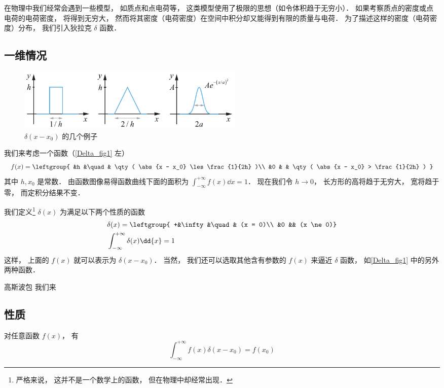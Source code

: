 
在物理中我们经常会遇到一些模型， 如质点和点电荷等， 这类模型使用了极限的思想（如令体积趋于无穷小）． 如果考察质点的密度或点电荷的电荷密度， 将得到无穷大， 然而将其密度（电荷密度）在空间中积分却又能得到有限的质量与电荷． 为了描述这样的密度（电荷密度）分布， 我们引入狄拉克 $\delta$ 函数．

\subsection{一维情况}

\begin{figure}[ht]
\centering
\includegraphics[width=11cm]{./figures/Delta1.pdf}
\caption{$\delta(x - x_0)$ 的几个例子} \label{Delta_fig1}
\end{figure}

我们来考虑一个函数（\autoref{Delta_fig1} 左）
\begin{equation}
f(x) = \leftgroup{
&h &\quad & \qty( \abs{x - x_0} \les \frac{1}{2h} )\\
&0 &          & \qty( \abs{x - x_0} > \frac{1}{2h} )
}\end{equation}
其中 $h, x_0$ 是常数． 由函数图像易得函数曲线下面的面积为 $\int_{-\infty}^{+\infty} f(x) \dd{x} = 1$． 现在我们令 $h \to 0$， 长方形的高将趋于无穷大， 宽将趋于零， 而定积分结果不变．

我们定义\footnote{严格来说， 这并不是一个数学上的函数， 但在物理中却经常出现．} $\delta(x)$ 为满足以下两个性质的函数
\begin{align}
&\delta(x) = \leftgroup{
+&\infty &\quad& (x = 0)\\
&0 && (x \ne 0)}\\
&\int_{-\infty}^{+\infty} \delta(x) \dd{x} = 1
\end{align}
这样， 上面的 $f(x)$ 就可以表示为 $\delta(x - x_0)$． 当然， 我们还可以选取其他含有参数的 $f(x)$ 来逼近 $\delta$ 函数， 如\autoref{Delta_fig1} 中的另外两种函数．

\begin{exam}{高斯波包}
我们来
\end{exam}

\subsection{性质}
对任意函数 $f(x)$， 有
\begin{equation}
\int_{-\infty}^{+\infty} f(x) \delta(x - x_0) = f(x_0)
\end{equation}

